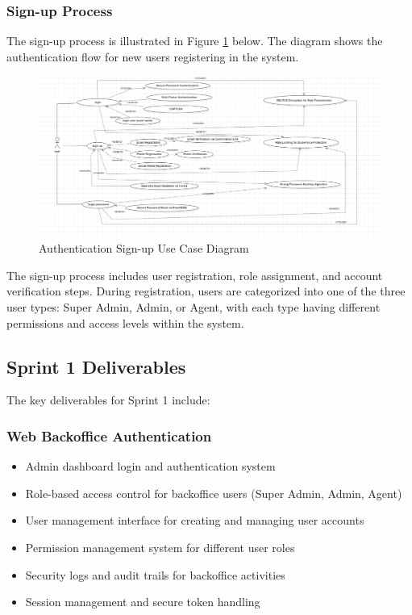 \subsubsection{Sign-up Process}
The sign-up process is illustrated in Figure \ref{fig:signup-diagram} below. The diagram shows the authentication flow for new users registering in the system.

\begin{figure}[ht!]
    \centering
    \includegraphics[width=1\textwidth]{images/diagram_de_case_d_utilisation_signup.png}
    \caption{Authentication Sign-up Use Case Diagram}
    \label{fig:signup-diagram}
\end{figure}

\newpage

The sign-up process includes user registration, role assignment, and account verification steps. During registration, users are categorized into one of the three user types: Super Admin, Admin, or Agent, with each type having different permissions and access levels within the system.

\subsection{Sprint 1 Deliverables}
The key deliverables for Sprint 1 include:

\subsubsection{Web Backoffice Authentication}
\begin{itemize}
    \item Admin dashboard login and authentication system
    \item Role-based access control for backoffice users (Super Admin, Admin, Agent)
    \item User management interface for creating and managing user accounts
    \item Permission management system for different user roles
    \item Security logs and audit trails for backoffice activities
    \item Session management and secure token handling
\end{itemize}
